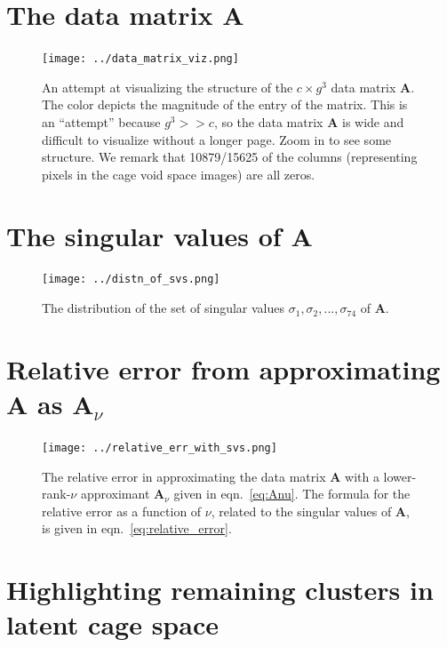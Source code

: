 \documentclass[journal=jacsat,manuscript=article]{achemso}
\begin{document}
\newpage

\section{The data matrix $\mathbf{A}$}

\begin{figure}
\centering
	\texttt{[image: ../data\_matrix\_viz.png]}
	\caption{An attempt at visualizing the structure of the $c \times g^3$ data matrix $\mathbf{A}$. The color depicts the magnitude of the entry of the matrix. This is an ``attempt'' because $g^3>>c$, so the data matrix $\mathbf{A}$ is wide and difficult to visualize without a longer page. Zoom in to see some structure. We remark that 10879/15625 of the columns (representing pixels in the cage void space images) are all zeros.
	} \label{fig:data_matrix}
\end{figure}

\newpage
\clearpage

\section{The singular values of $\mathbf{A}$}

\begin{figure}
\centering
	\texttt{[image: ../distn\_of\_svs.png]}
	\caption{The distribution of the set of singular values $\sigma_1,\sigma_2, ..., \sigma_{74}$ of $\mathbf{A}$.
	} \label{fig:distn_of_svs}
\end{figure}

\newpage
\clearpage

\section{Relative error from approximating $\mathbf{A}$ as $\mathbf{A}_\nu$}

\begin{figure}
\centering
	\texttt{[image: ../relative\_err\_with\_svs.png]}
	\caption{The relative error in approximating the data matrix $\mathbf{A}$ with a lower-rank-$\nu$ approximant $\mathbf{A}_\nu$ given in eqn.~\ref{eq:Anu}. The formula for the relative error as a function of $\nu$, related to the singular values of $\mathbf{A}$, is given in eqn.~\ref{eq:relative_error}.
	} \label{fig:relative_err_with_svs}
\end{figure}

\newpage
\clearpage

\section{Highlighting remaining clusters in latent cage space}
\end{document}
